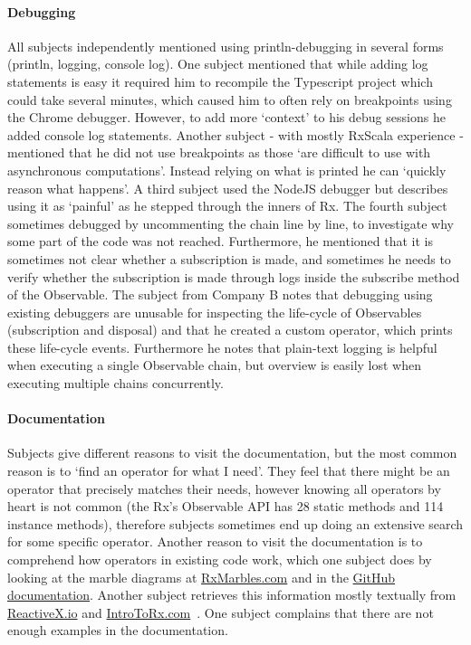 \paragraph{Debugging}
All subjects independently mentioned using println-debugging in several forms (println, logging, console log).
One subject mentioned that while adding log statements is easy it required him to recompile the Typescript project which could take several minutes, 
which caused him to often rely on breakpoints using the Chrome debugger. However, to add more `context' to his debug sessions he added console log statements.
Another subject - with mostly RxScala experience - mentioned that he did not use breakpoints as those `are difficult to use with asynchronous computations'. 
Instead relying on what is printed he can `quickly reason what happens'.
A third subject used the NodeJS debugger but describes using it as `painful' as he stepped through the inners of Rx.
The fourth subject sometimes debugged by uncommenting the chain line by line, to investigate why some part of the code was not reached. Furthermore, he mentioned that it is sometimes not clear whether a subscription is made, and sometimes he needs to verify whether the subscription is made through logs inside the subscribe method of the Observable.
The subject from Company B notes that debugging using existing debuggers are unusable for inspecting the life-cycle of Observables (subscription and disposal) and that he created a custom  operator, which prints these life-cycle events. Furthermore he notes that plain-text logging is helpful when executing a single Observable chain, but overview is easily lost when executing multiple chains concurrently.

\paragraph{Documentation}
Subjects give different reasons to visit the documentation, but the most common reason is to `find an operator for what I need'. They feel that there might be an operator that precisely matches their needs, however knowing all operators by heart is not common (the Rx's Observable API has 28 static methods and 114 instance methods), therefore subjects sometimes end up doing an extensive search for some specific operator. Another reason to visit the documentation is to comprehend how operators in existing code work, which one subject does by looking at the marble diagrams at \href{http://rxmarbles.com}{RxMarbles.com} and in the \href{https://github.com/Reactive-Extensions/RxJS/blob/master/doc/}{GitHub documentation}. Another subject retrieves this information mostly textually from \href{http://reactivex.io/rxjs}{ReactiveX.io} and \href{http://introtorx.com}{IntroToRx.com}~\cite{introtorx}. One subject complains that there are not enough examples in the documentation.

